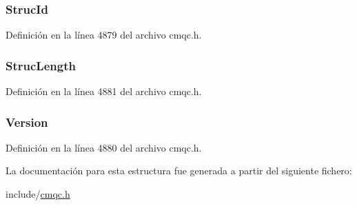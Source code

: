 \subsubsection[{Struc\+Id}]{ Struc\+Id}\label{structtag_m_q_r_f_h_a0530922ca944569b52601d74941f96e4}


Definición en la línea 4879 del archivo cmqc.\+h.

\hypertarget{structtag_m_q_r_f_h_a830af9a4a08c015b9a4b2d39d4d3420a}{}
\subsubsection[{Struc\+Length}]{ Struc\+Length}\label{structtag_m_q_r_f_h_a830af9a4a08c015b9a4b2d39d4d3420a}


Definición en la línea 4881 del archivo cmqc.\+h.

\hypertarget{structtag_m_q_r_f_h_a0656ef8f766b3907d394d88a35d7b7e9}{}
\subsubsection[{Version}]{ Version}\label{structtag_m_q_r_f_h_a0656ef8f766b3907d394d88a35d7b7e9}


Definición en la línea 4880 del archivo cmqc.\+h.



La documentación para esta estructura fue generada a partir del siguiente fichero\+:\begin{DoxyCompactItemize}
\item 
include/\hyperlink{cmqc_8h}{cmqc.\+h}\end{DoxyCompactItemize}

